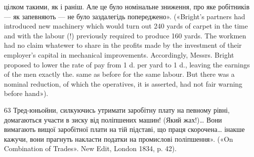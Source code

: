 цілком такими, як і раніш. Але це було номінальне зниження, про яке
робітників — як запевняють — не було заздалегідь попереджено». («Bright’s
partners had introduced new machinery which would turn out 240 yards
of carpet in the time and with the labour (!) previously required to produce
160 yards. The workmen had no claim whatewer to share in the profits
made by the investment of their employer’s capital in mechanical improvements.
Accordingly, Messrs. Bright proposed to lower the rate of pay from
1 d. per yard to 1 d., leaving the earnings of the men exactly the. same
as before for the same labour. But there was a nominal reduction, of which
the operatives, it is asserted, had not fair warning before hand»).

63    Тред-юньойни, силкуючись утримати заробітну плату на певному
рівні, домагаються участи в зиску від поліпшених машин! (Який
жах!)\dots{} Вони вимагають вищої заробітної плати на тій підставі, що праця
скорочена\dots{} інакше кажучи, вони прагнуть накласти податки на промислові
поліпшення». («On Combination of Trades». New Edit, London
1834, p. 42).

